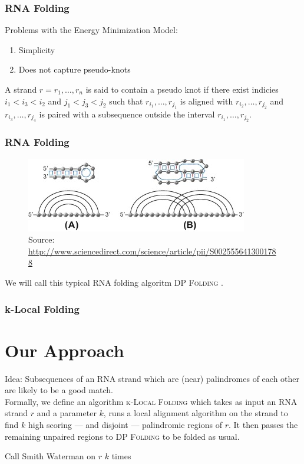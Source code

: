 \documentclass{beamer}
\newcommand{\klf}{\textsc{k-Local Folding} }
\newcommand{\rf}{\textsc{DP Folding} }
\begin{document}
\begin{frame}
\frametitle{RNA Folding}
Problems with the Energy Minimization Model:
\begin{enumerate}
\item Simplicity
\item Does not capture pseudo-knots
\end{enumerate}

\begin{definition}
A strand $r=r_1,\ldots,r_n$ is said to contain a pseudo knot if there exist indicies $i_1<i_3<i_2$ and $j_1<j_3<j_2$ such that $r_{i_1},\ldots,r_{j_1}$ is aligned with $r_{i_2},\ldots,r_{j_2}$  and $r_{i_3},\ldots,r_{j_4}$ is paired with a subsequence outside the interval $r_{i_1},\ldots,r_{j_2}$. 
\end{definition}
\end{frame}

\begin{frame}
\frametitle{RNA Folding}
\begin{figure}
\centering
\includegraphics[scale=0.8]{images/pseudoknot.jpg}
\caption{Source: \url{http://www.sciencedirect.com/science/article/pii/S0025556413001788}}
\end{figure}

We will call this typical RNA folding algoritm \rf. 

\end{frame}

\begin{frame}
\frametitle{k-Local Folding}
\section*{Our Approach}
Idea: Subsequences of an RNA strand which are (near) palindromes of each other are likely to be a good match. \\

Formally, we define an algorithm \klf which takes as input an RNA strand $r$ and a parameter $k$, runs a local alignment algorithm on the strand to find $k$ high scoring --- and disjoint --- palindromic regions of $r$. It then passes the remaining unpaired regions to \rf to be folded as usual. 

\begin{algorithmic}
\State Call Smith Waterman on $r$ $k$ times 
\EndFunction
\end{algorithmic}

\end{frame}
\end{document}
